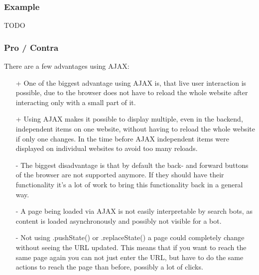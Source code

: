 \documentclass[f,bachelor,binding,twoside,palatino]{WeSTthesis}
\def \ajax {AJAX}
\begin{document}
    \subsubsection{Example}
    TODO

    \subsubsection{Pro / Contra}
  	  There are a few advantages using \ajax{}:
  	  \begin{itemize}
        \item[+]{One of the biggest advantage using \ajax{} is, that live user interaction is possible, due to the browser does not have to reload the whole website after interacting only with a small part of it.}
  	    \item[+]{Using \ajax{} makes it possible to display multiple, even in the backend, independent items on one website, without having to reload the whole website if only one changes. In the time before \ajax{} independent items were displayed on individual websites to avoid too many reloads.}
  	    \item[-]{The biggest disadvantage is that by default the back- and forward buttons of the browser are not supported anymore. If they should have their functionality it's a lot of work to bring this functionality back in a general way.}
  	    \item[-]{A page being loaded via \ajax{} is not easily interpretable by search bots, as content is loaded asynchronously and possibly not visible for a bot.}
  	    \item[-]{Not using .pushState() or .replaceState() a page could completely change without seeing the URL updated. This means that if you want to reach the same page again you can not just enter the URL, but have to do the same actions to reach the page than before, possibly a lot of clicks.}
  	  \end{itemize}

  
\end{document}
